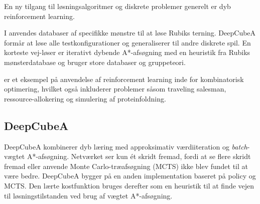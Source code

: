 \documentclass[../main.tex]{subfiles}
\begin{document}
En ny tilgang til løsningsalgoritmer og diskrete problemer generelt er dyb reinforcement learning. 


I \cite{SolvingNature} anvendes databaser af specifikke mønstre til at løse Rubiks terning. DeepCubeA formår at løse alle testkonfigurationer og generaliserer til andre diskrete spil. En korteste vej-løser er iterativt dybende A*-afsøgning med en heuristik fra Rubiks mønsterdatabase og bruger store databaser og gruppeteori. 
 
\cite{RubiksMedium} er et eksempel på anvendelse af reinforcement learning inde for kombinatorisk optimering, hvilket også inkluderer problemer såsom traveling salesman, ressource-allokering og simulering af proteinfoldning. 

\subsection{DeepCubeA}
DeepCubeA \cite{SolvingNature} kombinerer dyb læring med approksimativ værdiiteration og \emph{batch}-vægtet A*-afsøgning. Netværket ser kun ét skridt fremad, fordi at se flere skridt fremad eller anvende Monte Carlo-træafsøgning (MCTS) ikke blev fundet til at være bedre. DeepCubeA bygger på en anden implementation baseret på policy og MCTS. Den lærte kostfunktion bruges derefter som en heuristik til at finde vejen til løsningstilstanden ved brug af vægtet A*-afsøgning.  
\end{document}
